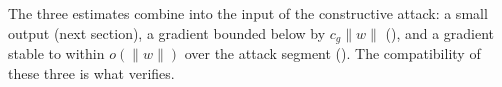The three estimates combine into the input of the constructive attack: a small output (next section),
a gradient bounded below by $c_g\|w\|$ (), and a gradient stable to within
$o(\|w\|)$ over the attack segment (). The compatibility of these three is what
 verifies.
